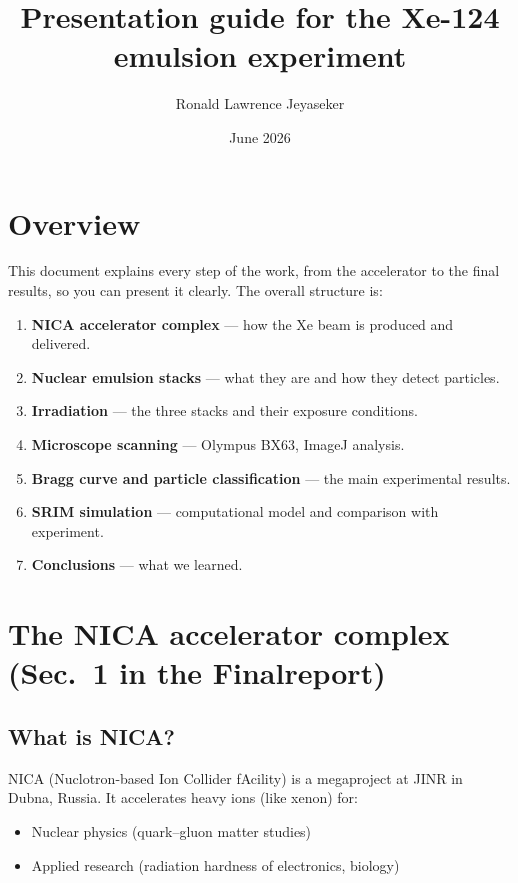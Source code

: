 \documentclass[12pt,a4paper]{article}
\title{\textbf{Presentation guide for the Xe-124 emulsion experiment}}
\author{Ronald Lawrence Jeyaseker}
\date{June 2026}
\begin{document}
\maketitle
\tableofcontents
\newpage

\section{Overview}

This document explains every step of the work, from the accelerator
to the final results, so you can present it clearly. The overall
structure is:

\begin{enumerate}
  \item \textbf{NICA accelerator complex} --- how the Xe beam is produced
        and delivered.
  \item \textbf{Nuclear emulsion stacks} --- what they are and how they
        detect particles.
  \item \textbf{Irradiation} --- the three stacks and their exposure
        conditions.
  \item \textbf{Microscope scanning} --- Olympus BX63, ImageJ analysis.
  \item \textbf{Bragg curve and particle classification} --- the main
        experimental results.
  \item \textbf{SRIM simulation} --- computational model and comparison
        with experiment.
  \item \textbf{Conclusions} --- what we learned.
\end{enumerate}

\section{The NICA accelerator complex (Sec.~1 in the Finalreport)}

\subsection{What is NICA?}

NICA (Nuclotron-based Ion Collider fAcility) is a megaproject at JINR
in Dubna, Russia. It accelerates heavy ions (like xenon) for:
\begin{itemize}
  \item Nuclear physics (quark--gluon matter studies)
  \item Applied research (radiation hardness of electronics, biology)
\end{itemize}
\end{document}
